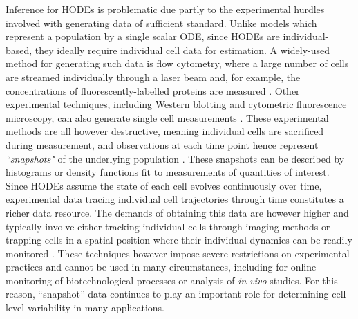 Inference for HODEs is problematic due partly to the experimental hurdles involved with generating data of sufficient standard. Unlike models which represent a population by a single scalar ODE, since HODEs are individual-based, they ideally require individual cell data for estimation. A widely-used method for generating such data is flow cytometry, where a large number of cells are streamed individually through a laser beam and, for example, the concentrations of fluorescently-labelled proteins are measured \cite{telford2012flow}. Other experimental techniques, including Western blotting and cytometric fluorescence microscopy, can also generate single cell measurements \cite{hughes2014single,hasenauer2011identification}. These experimental methods are all however destructive, meaning individual cells are sacrificed during measurement, and  observations at each time point hence represent \emph{``snapshots"} of the underlying population \cite{hasenauer2011identification}. These snapshots can be described by histograms \cite{dixit2018maximum} or density functions \cite{waldherr2018estimation} fit to measurements of quantities of interest. Since HODEs assume the state of each cell evolves continuously over time, experimental data tracing individual cell trajectories through time constitutes a richer data resource. The demands of obtaining this data are however higher and typically involve either tracking individual cells through imaging methods \cite{hilsenbeck2016software} or trapping cells in a spatial position where their individual dynamics can be readily monitored \cite{fritzsch2012single}. These techniques however impose severe restrictions on experimental practices and cannot be used in many circumstances, including for online monitoring of biotechnological processes or analysis of \textit{in vivo} studies. For this reason, ``snapshot'' data continues to play an important role for determining cell level variability in many applications.

